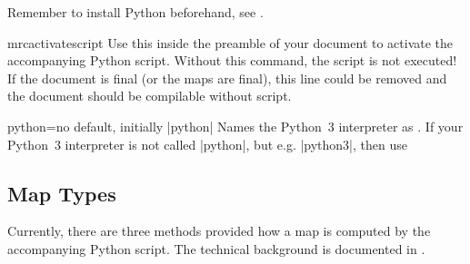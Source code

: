 Remember to install Python beforehand, see .

\begin{docCommand}{mrcactivatescript}{}
  Use this inside the preamble of your document to activate the
  accompanying Python script.
  Without this command, the script is not executed!
  If the document is final (or the maps are final),
  this line could be removed and the document
  should be compilable without script.
\end{docCommand}


\begin{docMrcKey}{python}{=}{no default, initially |python|}
  Names the Python~3 interpreter as . If your Python~3 interpreter
  is not called |python|, but e.g. |python3|, then use
  \begin{dispListing}
  \end{dispListing}
\end{docMrcKey}


\clearpage
\subsection{Map Types}
Currently, there are three methods provided how a map is computed by the
accompanying Python script. The technical background is documented in
\cite[Section~5]{Sturm:2020}.

